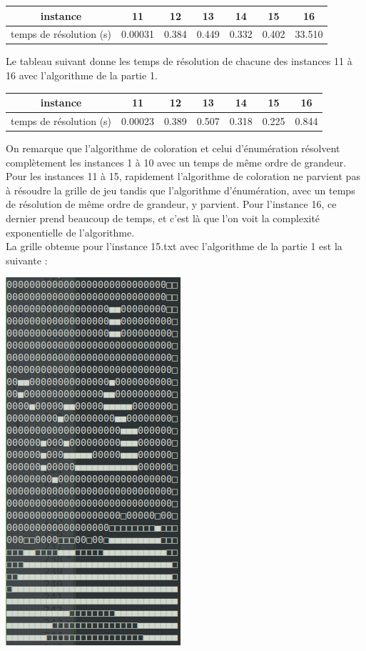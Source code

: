 \documentclass[12pt]{article}
\begin{document}
				\begin{center}
					\begin{tabular}{|c|c|c|c|c|c|c| }
						\hline
						instance & 11 & 12 & 13 & 14 & 15 & 16 \\ \hline
						temps de résolution (s) & 0.00031 & 0.384 & 0.449 & 0.332 & 0.402 & 33.510 \\ \hline
					\end{tabular}
				\end{center}
			
				Le tableau suivant donne les temps de résolution de chacune des instances 11 à 16 avec l'algorithme de la partie 1.
				\begin{center}
					\begin{tabular}{|c|c|c|c|c|c|c| }
						\hline
						instance & 11 & 12 & 13 & 14 & 15 & 16 \\ \hline
						temps de résolution (s) & 0.00023 & 0.389 & 0.507 & 0.318 & 0.225 & 0.844 \\ \hline
					\end{tabular}
				\end{center}
				
				On remarque que l'algorithme de coloration et celui d'énumération résolvent complètement les instances 1 à 10 avec un temps de même ordre de grandeur. Pour les instances 11 à 15, rapidement l'algorithme de coloration ne parvient pas à résoudre la grille de jeu tandis que l'algorithme d'énumération, avec un temps de résolution de même ordre de grandeur, y parvient. Pour l'instance 16, ce dernier prend beaucoup de temps, et c'est là que l'on voit la complexité exponentielle de l'algorithme. \\
				
				La grille obtenue pour l'instance 15.txt avec l'algorithme de la partie 1 est la suivante :
				\begin{center}
					\includegraphics[scale=0.4]{instance15-1.png}
				\end{center}
			
\end{document}
